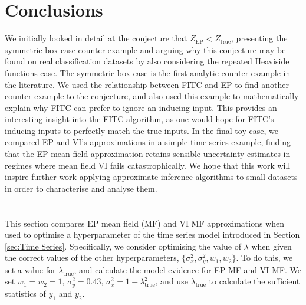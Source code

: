 \documentclass{article}
\begin{document}
\section{Conclusions}
%
We initially looked in detail at the conjecture that $Z_\mathrm{EP}<Z_\mathrm{true}$, presenting the symmetric box case counter-example and arguing why this conjecture may be found on real classification datasets by also considering the repeated Heaviside functions case. The symmetric box case is the first analytic counter-example in the literature. We used the relationship between FITC and EP to find another counter-example to the conjecture, and also used this example to mathematically explain why FITC can prefer to ignore an inducing input. This provides an interesting insight into the FITC algorithm, as one would hope for FITC's inducing inputs to perfectly match the true inputs. In the final toy case, we compared EP and VI's approximations in a simple time series example, finding that the EP mean field approximation retains sensible uncertainty estimates in regimes where mean field VI fails catastrophically. We hope that this work will inspire further work applying approximate inference algorithms to small datasets in order to characterise and analyse them.
%
%

\small



%
\newpage
%
\titleformat{\section}{\large\bfseries}{\appendixname~\thesection}{0.5em}{}
\appendix
\section{} \label{app:Time Series}
%
This section compares EP mean field (MF) and VI MF approximations when used to optimise a hyperparameter of the time series model introduced in Section \ref{sec:Time Series}. Specifically, we consider optimising the value of $\lambda$ when given the correct values of the other hyperparameters, $\{\sigma_x^2,\sigma_y^2,w_1,w_2\}$. To do this, we set a value for $\lambda_\mathrm{true}$, and calculate the model evidence for EP MF and VI MF. We set $w_1=w_2=1$, $\sigma_y^2=0.43$, $\sigma_x^2=1-\lambda_\mathrm{true}^2$, and use $\lambda_\mathrm{true}$ to calculate the sufficient statistics of $y_1$ and $y_2$.
\end{document}
